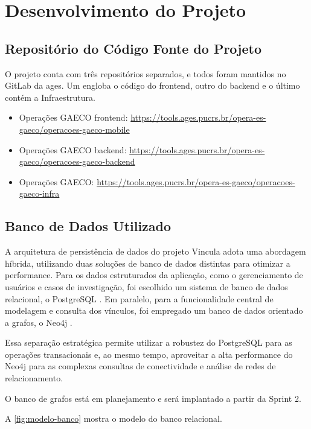\section[Desenvolvimento do Projeto]{Desenvolvimento do Projeto}

\subsection{Repositório do Código Fonte do Projeto}
  O projeto conta com três repositórios separados, e todos foram mantidos no GitLab da \ac{ages}. Um engloba o código do frontend, outro do backend e o último contém a Infraestrutura.
  
    \begin{itemize}
      \item Operações GAECO frontend: \url{https://tools.ages.pucrs.br/opera-es-gaeco/operacoes-gaeco-mobile}
      \item Operações GAECO backend: \url{https://tools.ages.pucrs.br/opera-es-gaeco/operacoes-gaeco-backend}
      \item Operações GAECO: \url{https://tools.ages.pucrs.br/opera-es-gaeco/operacoes-gaeco-infra}
    \end{itemize}

\subsection{Banco de Dados Utilizado}
  A arquitetura de persistência de dados do projeto Vincula adota uma abordagem híbrida, utilizando duas soluções de banco de dados distintas para otimizar a performance. Para os dados estruturados da aplicação, como o gerenciamento de usuários e casos de investigação, foi escolhido um sistema de banco de dados relacional, o PostgreSQL \cite{postgresql}. Em paralelo, para a funcionalidade central de modelagem e consulta dos vínculos, foi empregado um banco de dados orientado a grafos, o Neo4j \cite{neo4j}.

  Essa separação estratégica permite utilizar a robustez do PostgreSQL para as operações transacionais e, ao mesmo tempo, aproveitar a alta performance do Neo4j para as complexas consultas de conectividade e análise de redes de relacionamento.
  
  O banco de grafos está em planejamento e será implantado a partir da Sprint 2.

  A \autoref{fig:modelo-banco} mostra o modelo do banco relacional.

